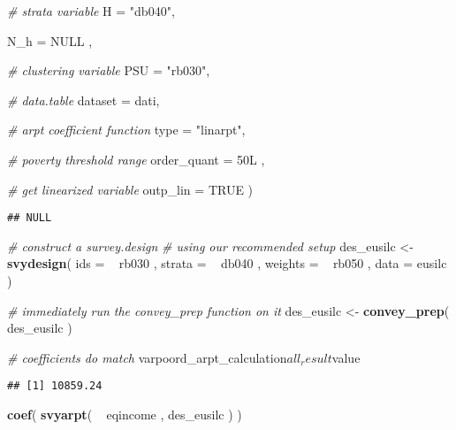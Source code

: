 \documentclass[]{book}
\newenvironment{Shaded}{\begin{snugshade}}{\end{snugshade}}
\newcommand{\KeywordTok}[1]{\textcolor[rgb]{0.13,0.29,0.53}{\textbf{{#1}}}}
\newcommand{\DataTypeTok}[1]{\textcolor[rgb]{0.13,0.29,0.53}{{#1}}}
\newcommand{\StringTok}[1]{\textcolor[rgb]{0.31,0.60,0.02}{{#1}}}
\newcommand{\CommentTok}[1]{\textcolor[rgb]{0.56,0.35,0.01}{\textit{{#1}}}}
\newcommand{\OtherTok}[1]{\textcolor[rgb]{0.56,0.35,0.01}{{#1}}}
\newcommand{\NormalTok}[1]{{#1}}
\begin{document}
\begin{Shaded}
\begin{Highlighting}[]
        \CommentTok{# strata variable}
        \DataTypeTok{H =} \StringTok{"db040"}\NormalTok{, }
        
        \DataTypeTok{N_h =} \OtherTok{NULL} \NormalTok{,}
        
        \CommentTok{# clustering variable}
        \DataTypeTok{PSU =} \StringTok{"rb030"}\NormalTok{, }
        
        \CommentTok{# data.table}
        \DataTypeTok{dataset =} \NormalTok{dati, }
        
        \CommentTok{# arpt coefficient function}
        \DataTypeTok{type =} \StringTok{"linarpt"}\NormalTok{,}
      
      \CommentTok{# poverty threshold range}
      \DataTypeTok{order_quant =} \NormalTok{50L ,}
      
        \CommentTok{# get linearized variable}
      \DataTypeTok{outp_lin =} \OtherTok{TRUE}
    \NormalTok{)}
\end{Highlighting}
\end{Shaded}

\begin{verbatim}
## NULL
\end{verbatim}

\begin{Shaded}
\begin{Highlighting}[]
\CommentTok{# construct a survey.design}
\CommentTok{# using our recommended setup}
\NormalTok{des_eusilc <-}\StringTok{ }
\StringTok{    }\KeywordTok{svydesign}\NormalTok{( }
        \DataTypeTok{ids =} \NormalTok{~}\StringTok{ }\NormalTok{rb030 , }
        \DataTypeTok{strata =} \NormalTok{~}\StringTok{ }\NormalTok{db040 ,  }
        \DataTypeTok{weights =} \NormalTok{~}\StringTok{ }\NormalTok{rb050 , }
        \DataTypeTok{data =} \NormalTok{eusilc}
    \NormalTok{)}

\CommentTok{# immediately run the convey_prep function on it}
\NormalTok{des_eusilc <-}\StringTok{ }\KeywordTok{convey_prep}\NormalTok{( des_eusilc )}

\CommentTok{# coefficients do match}
\NormalTok{varpoord_arpt_calculation$all_result$value}
\end{Highlighting}
\end{Shaded}

\begin{verbatim}
## [1] 10859.24
\end{verbatim}

\begin{Shaded}
\begin{Highlighting}[]
\KeywordTok{coef}\NormalTok{( }\KeywordTok{svyarpt}\NormalTok{( ~}\StringTok{ }\NormalTok{eqincome , des_eusilc ) )}
\end{Highlighting}
\end{Shaded}
\end{document}
